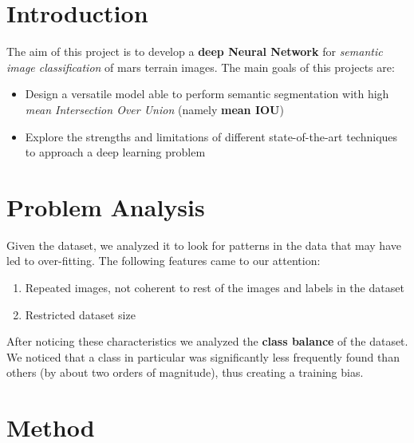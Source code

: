 \documentclass[11pt]{article}
\begin{document}
    \begin{multicols}{2}
    
        \section{Introduction}
        The aim of this project is to develop a \textbf{deep Neural Network} for \textit{semantic image classification} of mars terrain images.
        The main goals of this projects are:
        \begin{itemize}
            \item Design a versatile model able to perform semantic segmentation with high \textit{mean Intersection Over Union} (namely \textbf{mean IOU})
            \item Explore the strengths and limitations of different state-of-the-art techniques to approach a deep learning problem
        \end{itemize}

        
        \section{Problem Analysis}
        Given the dataset, we analyzed it to look for patterns in the data that may have led to over-fitting.
        The following features came to our attention:
        \begin{enumerate}
            \item Repeated images, not coherent to rest of the images and labels in the dataset
            \item Restricted dataset size
        \end{enumerate}
        After noticing these characteristics we analyzed the \textbf{class balance} of the dataset. We noticed that a class in particular was significantly less frequently found than others (by about two orders of magnitude), thus creating a training bias.
        
        
        \section{Method}

\end{multicols}
\end{document}

